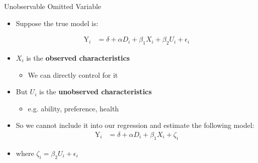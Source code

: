 \documentclass[dvipsnames,hyperref={pdfpagelabels=false}]{beamer}
\begin{document}
\begin{frame}{Unobservable Omitted Variable}
	
	\begin{itemize}
		\item Suppose the true model is:
		
		\begin{align*}
		\mathrm{Y}_i &= \delta + \alpha D_i + \beta_{1} X_{i} + \beta_{2} U_{i} + \epsilon_{i}
		\end{align*}
		
		\vspace{0.3cm}
		\item $X_{i}$ is the \textbf{observed characteristics} 
		\vspace{0.3cm}
		\begin{itemize}
			\item We can directly control for it
		\end{itemize}
				\vspace{0.3cm}
		\item But $U_{i}$ is the \textbf{unobserved characteristics} 
				\vspace{0.3cm}
			\begin{itemize}
		\item e.g. ability, preference, health
			\end{itemize}
		\vspace{0.3cm}
		\item So we cannot include it into our regression and estimate the following model:
		\begin{align*}
		\mathrm{Y}_i &= \delta + \alpha D_i + \beta_{1} X_{i} + \zeta_i
		\end{align*}
		\item where $\zeta_i = \beta_{2} U_{i} + \epsilon_{i}$
		
	\end{itemize}
	
\end{frame}
\end{document}
